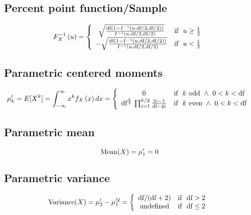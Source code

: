 \documentclass{article}
\begin{document}
\subsection{Percent point function/Sample}
\begin{equation*} F^{-1}_{X}\left(u\right)=\left\{\begin{array}{cl} \sqrt{\frac{\text{df}(1-I^{-1}\left(u,\text{df}/2,\text{df}/2\right))}{I^{-1}\left(u,\text{df}/2,\text{df}/2\right)}} & \text{if } \ u \geq \frac{1}{2} \\ -\sqrt{\frac{\text{df}(1-I^{-1}\left(u,\text{df}/2,\text{df}/2\right))}{I^{-1}\left(u,\text{df}/2,\text{df}/2\right)}} & \text{if } \ u < \frac{1}{2} \end{array} \right.\\ \end{equation*}
\subsection{Parametric centered moments}
\begin{equation*} \mu'_{k}=E[X^k]=\int_{-\infty }^{\infty }x^{k}f_{X}\left(x\right)dx=\left\{\begin{array}{cl} 0 & \text{if } \ k\text{ odd} \ \wedge \ 0 < k < \text{df} \\ \text{df}^{\frac{k}{2}} \,\prod_{i=1}^{k/2}\frac{2i-1}{\text{df}-2i} & \text{if } \ k\text{ even} \ \wedge \ 0 < k < \text{df} \end{array} \right.\\ \end{equation*}
\subsection{Parametric mean}
\begin{equation*} \mathrm{Mean}(X)=\mu'_{1}=0\\ \end{equation*}
\subsection{Parametric variance}
\begin{equation*} \mathrm{Variance}(X)=\mu'_{2}-\mu'^{2}_{1}=\left\{\begin{array}{cl} \text{df}/(\text{df}+2) & \text{if } \ \text{df} > 2 \\ \text{undefined} & \text{if } \  \text{df} \leq 2 \end{array} \right.\\ \end{equation*}
\end{document}
